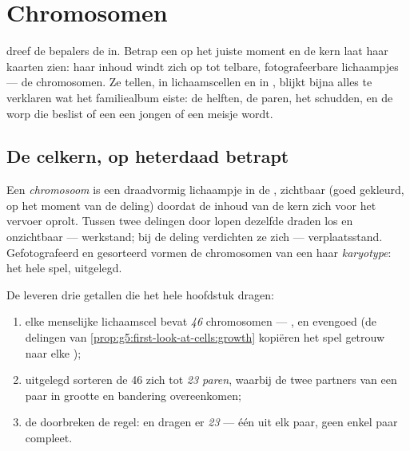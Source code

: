 \chapter{Chromosomen}\label{ch:g9:chromosomes}

 dreef de bepalers
de  in. Betrap een  op het juiste moment en de kern
laat haar kaarten zien: haar inhoud windt zich op tot telbare,
fotografeerbare lichaampjes --- de chromosomen. Ze tellen, in
lichaamscellen en in , blijkt bijna alles te
verklaren wat het familiealbum eiste: de helften, de paren, het
schudden, en de worp die beslist of een  een jongen of een
meisje wordt.

\section{De celkern, op heterdaad betrapt}

\begin{definition}[Chromosomen]\label{def:g9:chromosomes:chromosomes}
Een \emph{chromosoom} is een draadvormig
lichaampje in de , zichtbaar (goed gekleurd, op het
moment van de deling) doordat de inhoud van de kern zich voor
het vervoer oprolt. Tussen twee delingen door lopen dezelfde
draden los en onzichtbaar --- werkstand; bij de deling
verdichten ze zich --- verplaatsstand. Gefotografeerd en
gesorteerd vormen de chromosomen van een  haar
\emph{karyotype}: het hele spel, uitgelegd.
\end{definition}

\begin{proposition}\label{prop:g9:chromosomes:counts}
De  leveren drie getallen die het hele hoofdstuk
dragen:
\begin{enumerate}
  \item elke menselijke lichaamscel bevat \emph{46}
        chromosomen --- ,  en  evengoed
        (de delingen van
        \cref{prop:g5:first-look-at-cells:growth} kopiëren het
        spel getrouw naar elke );
  \item uitgelegd sorteren de 46 zich tot \emph{23 paren},
        waarbij de twee partners van een paar in grootte en
        bandering overeenkomen;
  \item de \emph{} doorbreken de regel: 
        en  dragen er \emph{23} --- één  uit
        elk paar, geen enkel paar compleet.
\end{enumerate}
\end{proposition}
\admitted

